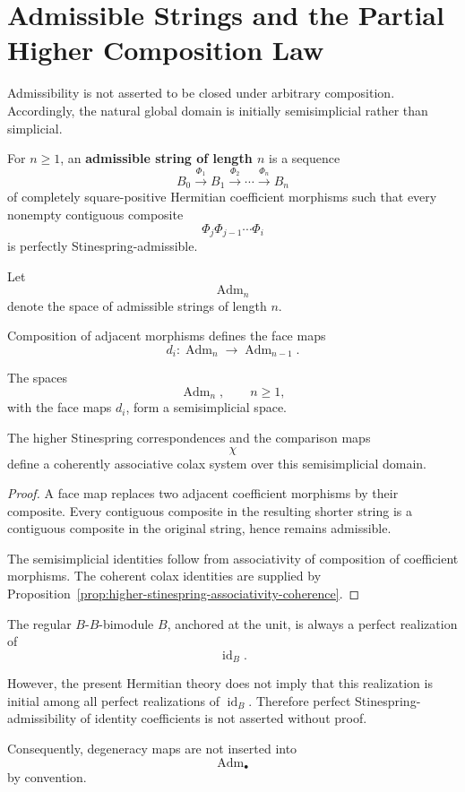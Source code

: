 \section{Admissible Strings and the Partial Higher Composition Law}
\label{sec:higher-admissible-strings}

Admissibility is not asserted to be closed under arbitrary composition.
Accordingly, the natural global domain is initially semisimplicial rather than
simplicial.

\begin{definition}
\label{def:higher-admissible-string}
For \(n\geq1\), an \textbf{admissible string of length \(n\)} is a sequence
\[
  B_0
  \xrightarrow{\Phi_1}
  B_1
  \xrightarrow{\Phi_2}
  \cdots
  \xrightarrow{\Phi_n}
  B_n
\]
of completely square-positive Hermitian coefficient morphisms such that every
nonempty contiguous composite
\[
  \Phi_j\Phi_{j-1}\cdots\Phi_i
\]
is perfectly Stinespring-admissible.
\end{definition}

Let
\[
  \operatorname{Adm}_n
\]
denote the space of admissible strings of length \(n\).

Composition of adjacent morphisms defines the face maps
\[
  d_i:
  \operatorname{Adm}_n
  \longrightarrow
  \operatorname{Adm}_{n-1}.
\]

\begin{proposition}
\label{prop:higher-admissible-semisimplicial-domain}
The spaces
\[
  \operatorname{Adm}_n,
  \qquad
  n\geq1,
\]
with the face maps \(d_i\), form a semisimplicial space.

The higher Stinespring correspondences and the comparison maps
\[
  \chi
\]
define a coherently associative colax system over this semisimplicial domain.
\end{proposition}

\begin{proof}
A face map replaces two adjacent coefficient morphisms by their composite.
Every contiguous composite in the resulting shorter string is a contiguous
composite in the original string, hence remains admissible.

The semisimplicial identities follow from associativity of composition of
coefficient morphisms. The coherent colax identities are supplied by
Proposition~\ref{prop:higher-stinespring-associativity-coherence}.
\end{proof}

\begin{remark}
\label{rem:higher-degeneracies-not-automatic}
The regular \(B\)-\(B\)-bimodule \(B\), anchored at the unit, is always a
perfect realization of
\[
  \operatorname{id}_B.
\]

However, the present Hermitian theory does not imply that this realization is
initial among all perfect realizations of \(\operatorname{id}_B\). Therefore
perfect Stinespring-admissibility of identity coefficients is not asserted
without proof.

Consequently, degeneracy maps are not inserted into
\[
  \operatorname{Adm}_\bullet
\]
by convention.
\end{remark}

